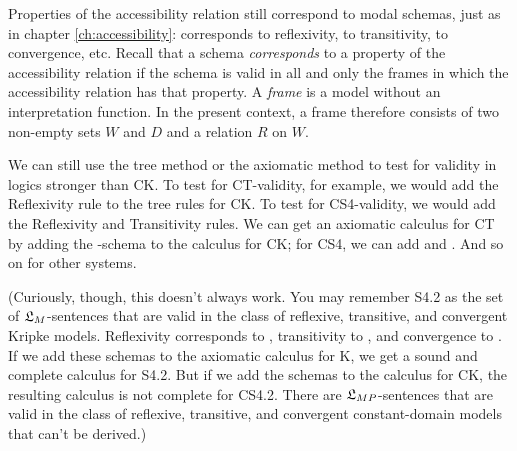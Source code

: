Properties of the accessibility relation still correspond to modal schemas, just
as in chapter \ref{ch:accessibility}:  corresponds to reflexivity, 
to transitivity,  to convergence, etc. Recall that a schema
\emph{corresponds} to a property of the accessibility relation if the schema is
valid in all and only the frames in which the accessibility relation has that
property. A \emph{frame} is a model without an interpretation function. In the
present context, a frame therefore consists of two non-empty sets $W$ and $D$ and a
relation $R$ on $W$.

We can still use the tree method or the axiomatic method to test for validity in
logics stronger than CK. To test for CT-validity, for example, we would add the
Reflexivity rule to the tree rules for CK. To test for CS4-validity, we would
add the Reflexivity and Transitivity rules. We can get an axiomatic calculus for
CT by adding the -schema to the calculus for CK; for CS4, we can add
 and . And so on for other systems.


(Curiously, though, this doesn't always work. You may remember S4.2 as the set of
$\mathfrak{L}_M$-sentences that are valid in the class of reflexive, transitive, and
convergent Kripke models. Reflexivity corresponds to , transitivity to
, and convergence to . If we add these schemas to the axiomatic
calculus for K, we get a sound and complete calculus for S4.2. But if we add the
schemas to the calculus for CK, the resulting calculus is not complete for
CS4.2. There are $\mathfrak{L}_{MP}$-sentences that are valid in the class of reflexive,
transitive, and convergent constant-domain models that can't be derived.)

%
%
%
%

